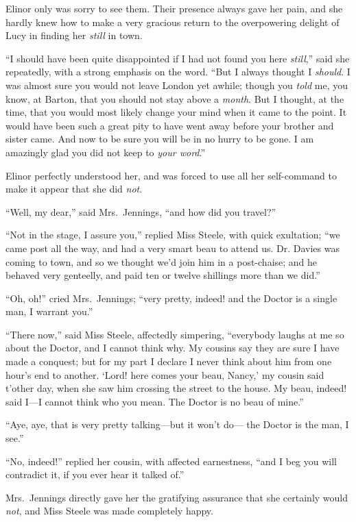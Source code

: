 Elinor only was sorry to see them.  Their presence
always gave her pain, and she hardly knew how to make
a very gracious return to the overpowering delight of Lucy
in finding her \emph{still} in town.

``I should have been quite disappointed if I had not
found you here \emph{still},'' said she repeatedly, with a strong
emphasis on the word.  ``But I always thought I \emph{should}.
I was almost sure you would not leave London yet awhile;
though you \emph{told} me, you know, at Barton, that you should
not stay above a \emph{month}.  But I thought, at the time,
that you would most likely change your mind when it came
to the point.  It would have been such a great pity
to have went away before your brother and sister came.
And now to be sure you will be in no hurry to be gone.
I am amazingly glad you did not keep to \emph{your word}.''

Elinor perfectly understood her, and was forced
to use all her self-command to make it appear that she
did \emph{not}.

``Well, my dear,'' said Mrs.\ Jennings, ``and how did
you travel?''

``Not in the stage, I assure you,'' replied Miss Steele,
with quick exultation; ``we came post all the way, and had
a very smart beau to attend us.  Dr. Davies was coming
to town, and so we thought we'd join him in a post-chaise;
and he behaved very genteelly, and paid ten or twelve
shillings more than we did.''

``Oh, oh!'' cried Mrs.\ Jennings; ``very pretty,
indeed! and the Doctor is a single man, I warrant you.''

``There now,'' said Miss Steele, affectedly simpering,
``everybody laughs at me so about the Doctor, and I
cannot think why.  My cousins say they are sure I have
made a conquest; but for my part I declare I never think
about him from one hour's end to another.  `Lord! here
comes your beau, Nancy,' my cousin said t'other day,
when she saw him crossing the street to the house.
My beau, indeed! said I---I cannot think who you mean.
The Doctor is no beau of mine.''

``Aye, aye, that is very pretty talking---but it won't do---%
the Doctor is the man, I see.''

``No, indeed!'' replied her cousin, with affected earnestness,
``and I beg you will contradict it, if you ever hear it talked
of.''

Mrs.\ Jennings directly gave her the gratifying
assurance that she certainly would \emph{not}, and Miss Steele
was made completely happy.

